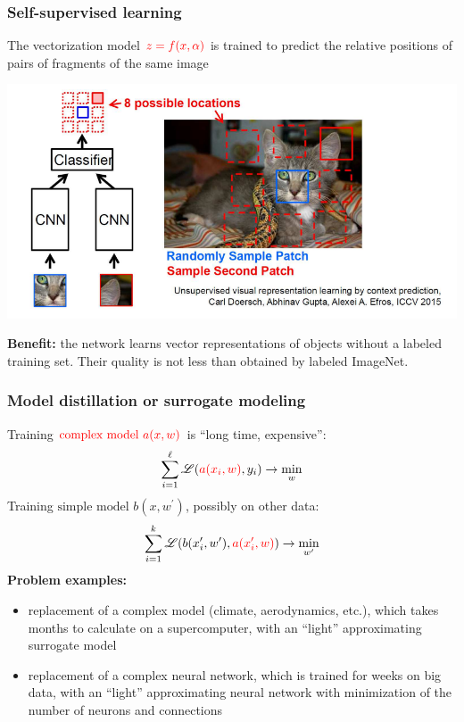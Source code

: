 \documentclass[fullscreen=true, bookmarks=true, hyperref={pdfencoding=unicode}]{beamer}
\begin{document}
\begin{frame}
  \frametitle{Self-supervised learning}

  The vectorization model ${\color{red}z=f(x,\alpha)}$ is trained to predict the relative positions of pairs of fragments of the same image

  \begin{center}
    \includegraphics[keepaspectratio,
                     width=.7\paperwidth]{self-supervised.png}
  \end{center}

  {\bf Benefit:} the network learns vector representations of objects without a labeled training set. Their quality is not less than obtained by labeled ImageNet.
\end{frame}


\begin{frame}
  \frametitle{Model distillation or surrogate modeling}

  Training ${\color{red}\text{complex model } a(x, w)}$ is ``long time, expensive'':
  $$\sum\limits_{i=1}^\ell \mathscr{L}({\color{red}a(x_i, w)}, y_i) \to \min_{w}$$
  Training ${\text{simple model } b(x, w^\prime)}$, possibly on other data:
  $$\sum\limits_{i=1}^k \mathscr{L}({b(x_i^\prime, w^\prime)}, {\color{red}a(x_i^\prime, w)} ) \to \min_{w^\prime} $$
  \pause
  {\bf Problem examples:}
  \begin{itemize}
    \item replacement of a complex model (climate, aerodynamics, etc.), which takes months to calculate on a supercomputer, with an ``light'' approximating surrogate model
    \item replacement of a complex neural network, which is trained for weeks on big data, with an ``light'' approximating neural network with minimization of the number of neurons and connections
    \end{itemize}
\end{frame}
\end{document}

